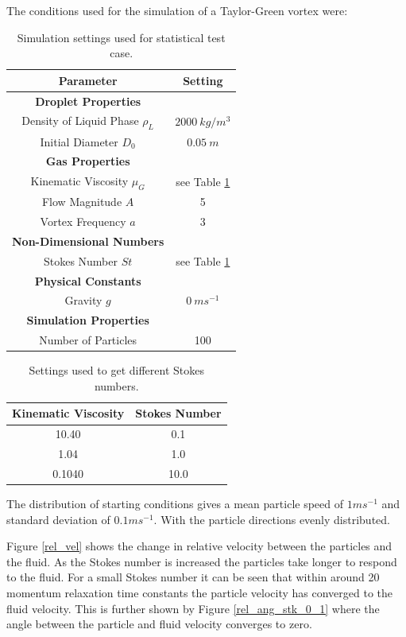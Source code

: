 \documentclass[../Interim_Report_Master]{subfiles}
\begin{document}
The conditions used for the simulation of a Taylor-Green vortex were:
\begin{table}[h]
\centering
\begin{tabular}{|c c|}
	\hline
	\textbf{Parameter} & \textbf{Setting} \\ \hline
	\textbf{Droplet Properties} &  \\ 
	Density of Liquid Phase $\rho_L$ & $2000~kg/m^3$ \\
	Initial Diameter $D_0$ & $0.05~m$ \\ \hline 
	\textbf{Gas Properties} &  \\ 
	Kinematic Viscosity $\mu_G$ & see Table \ref{stk_test_case} \\ 
	Flow Magnitude $A$ & 5 \\
	Vortex Frequency $a$ & 3 \\ \hline
	\textbf{Non-Dimensional Numbers} &  \\ 
	Stokes Number $St$ & see Table \ref{stk_test_case}  \\ \hline
	\textbf{Physical Constants} &  \\ 
	Gravity $g$ & $0~ms^{-1}$ \\ \hline
	\textbf{Simulation Properties} &  \\ 
	Number of Particles & 100 \\ \hline
\end{tabular}
\caption{Simulation settings used for statistical test case.}
\end{table}

\begin{table}[h]
\centering
\begin{tabular}{|c c|}
	\hline
	\textbf{Kinematic Viscosity} & \textbf{Stokes Number} \\ \hline
 	10.40 & 0.1 \\
 	1.04 & 1.0 \\
 	0.1040 & 10.0 \\ \hline
\end{tabular}
\caption{Settings used to get different Stokes numbers.}
\label{stk_test_case}
\end{table}

The distribution of starting conditions gives a mean particle speed of $1ms^{-1}$ and standard deviation of $0.1ms^{-1}$. With the particle directions evenly distributed.

Figure \ref{rel_vel} shows the change in relative velocity between the particles and the fluid. As the Stokes number is increased the particles take longer to respond to the fluid. For a small Stokes number it can be seen that within around 20 momentum relaxation time constants the particle velocity has converged to the fluid velocity. This is further shown by Figure \ref{rel_ang_stk_0_1} where the angle between the particle and fluid velocity converges to zero.
\end{document}
